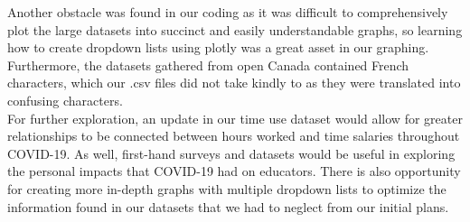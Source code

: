 \documentclass{article}
\begin{document}
Another obstacle was found in our coding as it was difficult to comprehensively plot the large datasets into succinct and easily understandable graphs, so learning how to create dropdown lists using plotly was a great asset in our graphing. Furthermore, the datasets gathered from open Canada contained French characters, which our .csv files did not take kindly to as they were translated into confusing characters.\\
For further exploration, an update in our time use dataset would allow for greater relationships to be connected between hours worked and time salaries throughout COVID-19. As well, first-hand surveys and datasets would be useful in exploring the personal impacts that COVID-19 had on educators. There is also opportunity for creating more in-depth graphs with multiple dropdown lists to optimize the information found in our datasets that we had to neglect from our initial plans.
\end{document}
